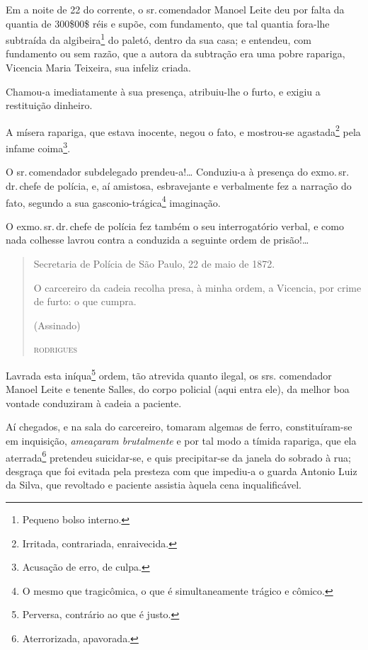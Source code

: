 Em a noite de 22 do corrente, o sr.\,comendador Manoel Leite deu por
falta da quantia de 300\$00\$ réis e supõe, com fundamento, que tal
quantia fora-lhe subtraída da algibeira\footnote{ Pequeno bolso
  interno.} do paletó, dentro da sua casa; e entendeu, com fundamento ou
sem razão, que a autora da subtração era uma pobre rapariga, Vicencia
Maria Teixeira, sua infeliz criada.

Chamou-a imediatamente à sua presença, atribuiu-lhe o furto, e exigiu a
restituição dinheiro.

A mísera rapariga, que estava inocente, negou o fato, e mostrou-se
agastada\footnote{ Irritada, contrariada, enraivecida.} pela infame
coima\footnote{ Acusação de erro, de culpa.}.

O sr.\,comendador subdelegado prendeu-a!\ldots{} Conduziu-a à presença do
exmo.\,sr.\,dr.\,chefe de polícia, e, aí amistosa, esbravejante e
verbalmente fez a narração do fato, segundo a sua
gasconio-trágica\footnote{ O mesmo que tragicômica, o que é
  simultaneamente trágico e cômico.} imaginação.

O exmo.\,sr.\,dr.\,chefe de polícia fez também o seu interrogatório verbal,
e como nada colhesse lavrou contra a conduzida a seguinte ordem de
prisão!\ldots{}

\begin{quote}
Secretaria de Polícia de São Paulo, 22 de maio de 1872.

O carcereiro da cadeia recolha presa, à minha ordem, a Vicencia, por
crime de furto: o que cumpra.

\begin{flushright}
(Assinado)

\textsc{rodrigues}
\end{flushright}
\end{quote}

Lavrada esta iníqua\footnote{ Perversa, contrário ao que é justo.}
ordem, tão atrevida quanto ilegal, os srs. comendador Manoel Leite e
tenente Salles, do corpo policial (aqui entra ele), da melhor boa
vontade conduziram à cadeia a paciente.

Aí chegados, e na sala do carcereiro, tomaram algemas de ferro,
constituíram-se em inquisição, \emph{ameaçaram brutalmente} e por tal
modo a tímida rapariga, que ela aterrada\footnote{ Aterrorizada,
  apavorada.} pretendeu suicidar-se, e quis precipitar-se da janela do
sobrado à rua; desgraça que foi evitada pela presteza com que impediu-a
o guarda Antonio Luiz da Silva, que revoltado e paciente assistia àquela
cena inqualificável.

